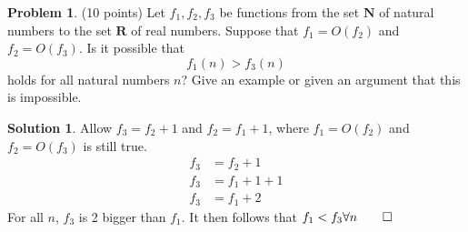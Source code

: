 \documentclass{article}
\theoremstyle{definition}
\newtheorem{problem}{Problem}
\newtheorem*{solution}{Solution}
\newcommand{\N}{\mathbf{N}}
\newcommand{\R}{\mathbf{R}}
\begin{document}
\begin{problem} (10 points) 
Let $f_1, f_2, f_3$ be functions from the set $\N$ of natural numbers
to the set $\R$ of real numbers. Suppose that $f_1= O(f_2)$ and
$f_2=O(f_3)$. Is it possible that 
$$ f_1(n) > f_3(n)$$ 
holds for all natural numbers $n$? Give an example or given an argument that this
is impossible. 
\end{problem}
\begin{solution}
Allow $f_3 = f_2 +1$ and $f_2 = f_1 +1$, where $f_1 = O(f_2)$ and $f_2 = O(f_3)$ is still true.
\begin{align*}
  f_3 &= f_2 +1 \\
  f_3 &= f_1 + 1 + 1 \\
  f_3 &= f_1 +2
\end{align*}
For all $n$, $f_3$ is 2 bigger than $f_1$. It then follows that $f_1 < f_3 \forall n \qed$
\end{solution}
\end{document}
